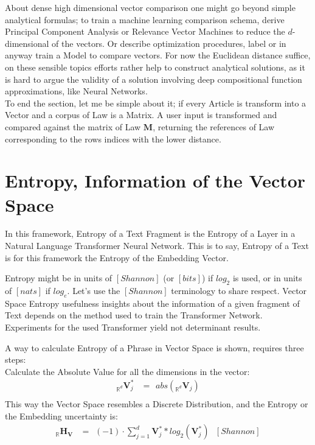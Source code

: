 \documentclass[a4paper,fleqn]{cas-sc}
\begin{document}
\noindent
About dense high dimensional vector comparison one might go beyond simple analytical formulas; to train a machine learning comparison 
schema, derive Principal Component Analysis or Relevance Vector Machines to reduce the $d$-dimensional of the vectors. 
Or describe optimization procedures, label or in anyway train a Model to compare vectors. For now the Euclidean distance suffice, 
on these sensible topics efforts rather help to construct analytical solutions, as it is hard to argue the validity of a 
solution involving deep compositional function approximations, like Neural Networks. \\

\noindent
To end the section, let me be simple about it; if every Article is transform into a Vector and a corpus of Law is a Matrix. 
A user input is transformed and compared against the matrix of Law $\mathbf{M}$, returning the references 
of Law corresponding to the rows indices with the lower distance. 

\section{Entropy, Information of the Vector Space}
In this framework, Entropy of a Text Fragment is the Entropy of a Layer in a Natural Language Transformer Neural Network. 
This is to say, Entropy of a Text is for this framework the Entropy of the Embedding Vector. 

\noindent
Entropy might be in units of $[Shannon]$ (or $[bits]$) if $log_{2}$ is used, or in units of $[nats]$ if $log_{e}$. 
Let's use the $[Shannon]$ terminology to share respect. Vector Space Entropy usefulness insights about the information 
of a given fragment of Text depends on the method used to train the Transformer Network. 
Experiments for the used Transformer yield \color{brown}not determinant results\color{black}. 

\noindent
A way to calculate Entropy of a Phrase in Vector Space is shown, requires three steps: \\

\noindent
Calculate the Absolute Value for all the dimensions in the vector: 
\begin{equation}
  \begin{split}
    {}_{\mathbb{R}^{d}}\mathbf{V}^{*}_{j}&=\hspace{5pt}abs({}_{\mathbb{R}^{d}}\mathbf{V}_{j})\\
  \end{split}
\end{equation}
This way the Vector Space resembles a Discrete Distribution, and the Entropy or the Embedding 
uncertainty is: \\
\begin{equation}
  \begin{split}
    _{\mathbb{R}}\mathbf{H}_{\mathbf{V}}&=\hspace{5pt} (-1) \cdot{}\sum_{j=1}^{d}\mathbf{V}^{*}_{j}*log_{2}(\mathbf{V}^{*}_{j})\hspace{8pt} [Shannon]  
  \end{split}
\end{equation}
\end{document}
